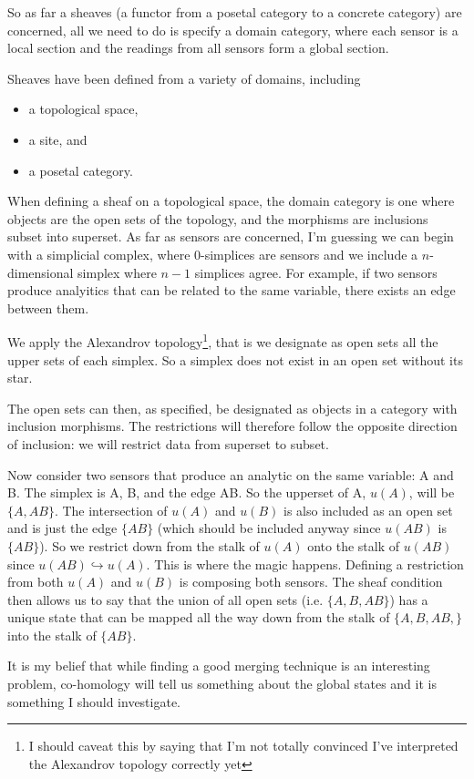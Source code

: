 So as far a sheaves (a functor from a posetal category to a concrete category)
are concerned, all we need to do is specify a domain category, where each
sensor is a local section and the readings from all sensors form a global
section. 

Sheaves have been defined from a variety of domains, including
\begin{itemize} 
	\item  a topological space\cite{topsheafWolfram},
	\item a site\cite{siteSheaf}, and
	\item a posetal category\cite{robinson2017sheaf}.
\end{itemize}

When defining a sheaf on a topological space, the domain category is one where
objects are the open sets of the topology, and the morphisms are inclusions
subset into superset. As far as sensors are concerned, I'm guessing we can
begin with a simplicial complex, where 0-simplices are sensors and we include a
$n$-dimensional simplex where $n-1$ simplices agree. For example, if two
sensors produce analyitics that can be related to the same variable, there
exists an edge between them.

We apply the Alexandrov topology\footnote{I should caveat this by saying that
I'm not totally convinced I've interpreted the Alexandrov topology correctly
yet}, that is we designate as open sets all the upper sets of each simplex. So
a simplex does not exist in an open set without its star.

The open sets can then, as specified, be designated as objects in a category
with inclusion morphisms. The restrictions will therefore follow the opposite
direction of inclusion: we will restrict data from superset to subset.

Now consider two sensors that produce an analytic on the same variable: A and
B.  The simplex is A, B, and the edge AB. So the upperset of A, $u(A)$, will be
$\{A,AB\}$. The intersection of $u(A)$ and $u(B)$ is also included as an open
set and is just the edge $\{AB\}$ (which should be included anyway since
$u(AB)$ is $\{AB\}$). So we restrict down from the stalk of $u(A)$ onto the
stalk of $u(AB)$ since $u(AB) \hookrightarrow u(A)$. This is where the magic
happens. Defining a restriction from both $u(A)$ and $u(B)$ is composing both
sensors. The sheaf condition\cite{spivak2014category} then allows us to say
that the union of all open sets (i.e. $\{A,B,AB\}$) has a unique state that can
be mapped all the way down from the stalk of $\{A,B,AB,\}$ into the stalk of
$\{AB\}$.

It is my belief that while finding a good merging technique is an interesting
problem, co-homology will tell us something about the global states and it is
something I should investigate.
